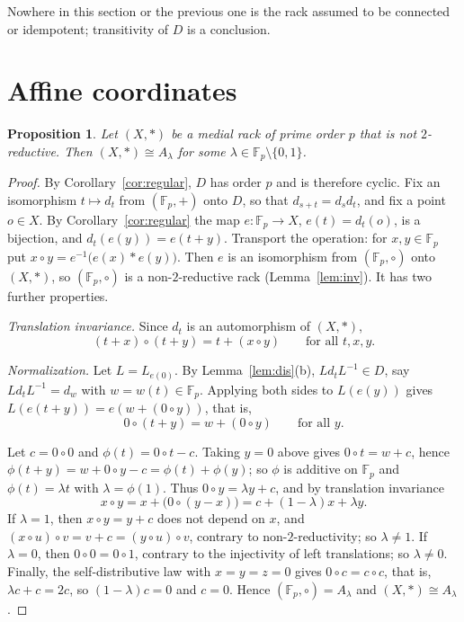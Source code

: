 \documentclass[11pt]{article}
\newtheorem{proposition}{Proposition}
\theoremstyle{definition}
\theoremstyle{remark}
\newcommand{\F}{\mathbb F}
\begin{document}
\noindent Nowhere in this section or the previous one is the rack assumed to be
connected or idempotent; transitivity of $D$ is a conclusion.

\section{Affine coordinates}\label{sec:affine}

\begin{proposition}\label{prop:affine}
Let $(X,*)$ be a medial rack of prime order $p$ that is not $2$-reductive.
Then $(X,*)\cong A_\lambda$ for some $\lambda\in\F_p\setminus\{0,1\}$.
\end{proposition}

\begin{proof}
By Corollary~\ref{cor:regular}, $D$ has order $p$ and is therefore cyclic. Fix
an isomorphism $t\mapsto d_t$ from $(\F_p,+)$ onto $D$, so that
$d_{s+t}=d_sd_t$, and fix a point $o\in X$. By Corollary~\ref{cor:regular} the
map $e\colon\F_p\to X$, $e(t)=d_t(o)$, is a bijection, and
$d_t(e(y))=e(t+y)$. Transport the operation: for $x,y\in\F_p$ put
$x\circ y=e^{-1}\bigl(e(x)*e(y)\bigr)$. Then $e$ is an isomorphism from
$(\F_p,\circ)$ onto $(X,*)$, so $(\F_p,\circ)$ is a non-$2$-reductive rack
(Lemma~\ref{lem:inv}). It has two further properties.

\emph{Translation invariance.} Since $d_t$ is an automorphism of $(X,*)$,
\[
(t+x)\circ(t+y)=t+(x\circ y)\qquad\text{for all }t,x,y.
\]

\emph{Normalization.} Let $L=L_{e(0)}$. By Lemma~\ref{lem:dis}(b),
$Ld_tL^{-1}\in D$, say $Ld_tL^{-1}=d_{w}$ with $w=w(t)\in\F_p$. Applying both sides to $L(e(y))$ gives
$L(e(t+y))=e(w+(0\circ y))$, that is,
\[
0\circ(t+y)=w+(0\circ y)\qquad\text{for all }y .
\]

Let $c=0\circ0$ and $\phi(t)=0\circ t-c$. Taking $y=0$ above gives
$0\circ t=w+c$, hence $\phi(t+y)=w+0\circ y-c=\phi(t)+\phi(y)$; so $\phi$ is
additive on $\F_p$ and $\phi(t)=\lambda t$ with $\lambda=\phi(1)$. Thus
$0\circ y=\lambda y+c$, and by translation invariance
\[
x\circ y=x+\bigl(0\circ(y-x)\bigr)=c+(1-\lambda)x+\lambda y .
\]
If $\lambda=1$, then $x\circ y=y+c$ does not depend on $x$, and
$(x\circ u)\circ v=v+c=(y\circ u)\circ v$, contrary to non-$2$-reductivity; so
$\lambda\ne1$. If $\lambda=0$, then $0\circ0=0\circ1$, contrary to the
injectivity of left translations; so $\lambda\ne0$. Finally, the
self-distributive law with $x=y=z=0$ gives $0\circ c=c\circ c$, that is,
$\lambda c+c=2c$, so $(1-\lambda)c=0$ and $c=0$. Hence $(\F_p,\circ)=A_\lambda$
and $(X,*)\cong A_\lambda$.
\end{proof}
\end{document}
